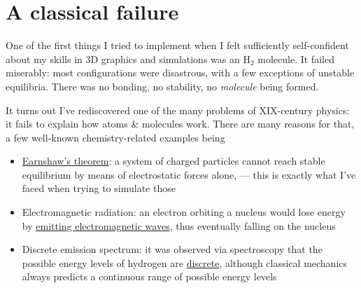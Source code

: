 \documentclass{article}
\newcommand{\molecule}[1]{\textrm{#1}}
\begin{document}
\newpage

\section{A classical failure}

One of the first things I tried to implement when I felt sufficiently self-confident about my skills in 3D graphics and simulations was an \(\molecule{H}_2\) molecule. It failed miserably: most configurations were disastrous, with a few exceptions of unstable equilibria. There was no bonding, no stability, no \textit{molecule} being formed.

It turns out I've rediscovered one of the many problems of XIX-century physics: it fails to explain how atoms \& molecules work. There are many reasons for that, a few well-known chemistry-related examples being

\begin{itemize}
\item \href{https://en.wikipedia.org/wiki/Earnshaw's_theorem}{Earnshaw's theorem}: a system of charged particles cannot reach stable equilibrium by means of electrostatic forces alone, --- this is exactly what I've faced when trying to simulate those
\item Electromagnetic radiation: an electron orbiting a nucleus would lose energy by \href{https://en.wikipedia.org/wiki/Larmor_formula}{emitting electromagnetic waves}, thus eventually falling on the nucleus
\item Discrete emission spectrum: it was observed via spectroscopy that the possible energy levels of hydrogen are \href{https://en.wikipedia.org/wiki/Hydrogen_spectral_series}{discrete}, although classical mechanics always predicts a continuous range of possible energy levels
\end{itemize}
\end{document}
